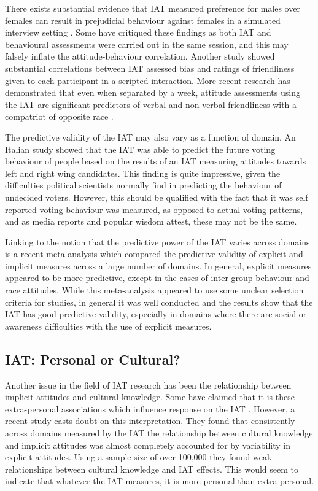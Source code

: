 There exists substantial evidence that IAT measured preference for males over females  can result in prejudicial behaviour against females in a simulated interview setting \cite{Greenwald2000,Heider2007}. Some have critiqued these findings as both IAT and behavioural assessments were carried out in the same session, and this may falsely inflate the attitude-behaviour correlation. Another study \cite{McConnell2001} showed substantial correlations between IAT assessed bias and ratings of friendliness given to each participant in a scripted interaction. More recent research has demonstrated that even when separated by a week, attitude assessments using the IAT are significant predictors of verbal and non verbal friendliness with a compatriot of opposite race \cite{Heider2007}. 

The predictive validity of the IAT may also vary as a function of domain. An Italian study \cite{Arcuri2008} showed that the IAT was able to predict the future voting behaviour of people based on the results of an IAT measuring attitudes towards left and right wing candidates. This finding is quite impressive, given the difficulties political scientists normally find in predicting the behaviour of undecided voters. However, this should be qualified with the fact that it was self reported voting behaviour was measured, as opposed to actual voting patterns, and as media reports and popular wisdom attest, these may not be the same.   

Linking to the notion that the predictive power of the IAT varies across domains is a recent meta-analysis \cite{Greenwald2009} which compared the predictive validity of explicit and implicit measures across a large number of domains. In general, explicit measures appeared to be more predictive, except in the cases of inter-group behaviour and race attitudes. While this meta-analysis appeared to use some unclear selection criteria for studies, in general it was well conducted and the results show that the IAT has good predictive validity, especially in domains where there are social or awareness difficulties with the use of explicit measures. 

\subsection{IAT: Personal or Cultural?}

Another issue in the field of IAT research has been the relationship between implicit attitudes and cultural knowledge. Some have claimed that it is these extra-personal associations which influence response on the IAT \cite{Olson2004}. However, a recent study \cite{Nosek2007a} casts doubt on this interpretation. They found that consistently across domains measured by the IAT the relationship between cultural knowledge and implicit attitudes was almost completely accounted for by variability in explicit attitudes. Using a sample size of over 100,000 they found weak relationships between cultural knowledge and IAT effects. This would seem to indicate that whatever the IAT measures, it is more personal than extra-personal. 

